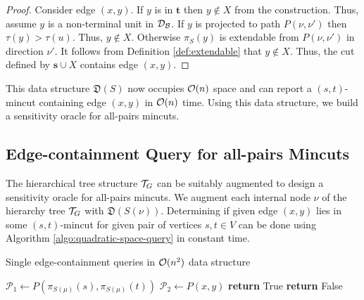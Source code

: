 \begin{proof}
Consider edge $(x,y)$. If $y$ is in $\mathbf t$ then $y \not \in X$ from the construction. Thus, assume $y$ is a non-terminal unit in ${\cal D}_{\cal B}$. If $y$ is projected to path $P(\nu,\nu')$ then $\tau(y) > \tau(u)$. Thus, $y \not \in X$. Otherwise $\pi_S(y)$ is extendable from $P(\nu,\nu')$ in direction $\nu'$. It follows from Definition \ref{def:extendable} that $y \not \in X$. Thus, the cut defined by ${\mathbf s} \cup X$ contains edge $(x,y)$.

\end{proof}

This data structure $\mathfrak{D}(S)$ now occupies ${\cal O}(n)$ space and can report a $(s,t)$-mincut containing edge $(x,y)$ in ${\cal O}(n)$ time. Using this data structure, we build a sensitivity oracle for all-pairs mincuts.


\subsection{Edge-containment Query for all-pairs Mincuts}
\label{subsec:all-pairs-mincuts}

The hierarchical tree structure ${\cal T}_G$ \cite{DBLP:journals/siamcomp/KatzKKP04} can be suitably augmented to design a sensitivity oracle for all-pairs mincuts. We augment each internal node $\nu$ of the hierarchy tree ${\cal T}_G$ with ${\mathfrak D}(S(\nu))$. Determining if given edge $(x,y)$ lies in some $(s,t)$-mincut for given pair of vertices $s,t\in V$ can be done using Algorithm \ref{algo:quadratic-space-query} in constant time. 

\begin{algorithm}%
    \caption{Single edge-containment queries in ${\cal O}(n^2)$ data structure}
    \label{algo:quadratic-space-query}
    \begin{algorithmic}[1] %
            \State $\mathcal P_1 \gets P(\pi_{S(\mu)}(s),\pi_{S(\mu)}(t))$
            \State $\mathcal P_2 \gets P(x,y)$
              
            \State \textbf{return} True
            \Else 
            \State \textbf{ return} False
            \EndIf
        \EndProcedure
    \end{algorithmic}
\end{algorithm}


